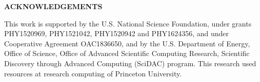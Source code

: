 \documentclass[10pt, paper=a4, UKenglish]{article}
\def\Acknowledgements{\bigskip  \bigskip \begin{center} \begin{large}
      \bf ACKNOWLEDGEMENTS \end{large}\end{center}}
\begin{document}

\Acknowledgements
This work is supported by the U.S. National Science Foundation, under grants PHY1520969, PHY1521042, PHY1520942 and PHY1624356, and under Cooperative Agreement OAC1836650, and by the U.S. Department
of Energy, Office of Science, Office of Advanced Scientific Computing Research, Scientific Discovery through Advanced Computing (SciDAC) program. This research used resources at research computing of Princeton University.







\end{document}
